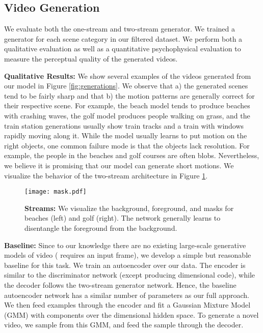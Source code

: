 \documentclass{article}
\begin{document}
\subsection{Video Generation}

We evaluate both the one-stream and two-stream generator. We trained a generator for each scene category in our filtered dataset. We perform both a qualitative evaluation as well as a  quantitative psychophysical evaluation to measure the perceptual quality of the generated videos.

\textbf{Qualitative Results:} 
We show several examples of the videos generated from our model in Figure \ref{fig:generations}. We observe that a) the generated scenes tend to be fairly sharp and that b) the motion patterns  are generally correct for their respective scene. For example, the beach model tends to produce beaches with crashing waves, the golf model produces people walking on grass, and the train station generations usually show train tracks and a train with windows rapidly moving along it. While the model usually learns to put motion on the right objects, one common failure mode is that the objects lack resolution. For example, the people in the beaches and golf courses are often blobs. Nevertheless, we believe it is promising that our model can generate short motions.  We visualize the behavior of the two-stream architecture in Figure \ref{fig:two-stream}.

\begin{figure}
\texttt{[image: mask.pdf]}
\vspace{-1em}
\caption{\textbf{Streams:} We visualize the background, foreground, and masks for beaches (left) and golf (right). The network generally learns to disentangle the foreground from the background.}
\label{fig:two-stream}
\vspace{-1em}
\end{figure}

\textbf{Baseline:} Since to our knowledge there are no existing large-scale generative models of video (\cite{ranzato2014video} requires an input frame), we develop a simple but reasonable baseline for this task. We train an autoencoder over our data. The encoder is similar to the discriminator network (except producing  dimensional code), while the decoder follows the two-stream generator network. Hence, the baseline autoencoder network has a similar number of parameters as our full approach. We then feed examples through the encoder and fit a Gaussian Mixture Model (GMM) with  components over the  dimensional hidden space. To generate a novel video, we sample from this GMM, and feed the sample through the decoder.
\end{document}
